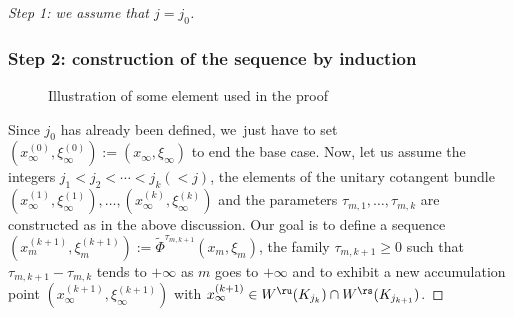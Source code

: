 \begin{proof}[Step 1: we assume that $j = j_0$]
\subsubsection*{Step 2: construction of the sequence by induction}
\begin{figure}[t]
\centering
\def\svgscale{0.6}

\caption{Illustration of some element used in the proof}
\end{figure}
Since $j_0$ has already been defined, we~just have to set $(x_{\infty}^{(0)}, \xi_{\infty}^{(0)}):= (x_{\infty}, \xi_{\infty})$ to end the base case. Now, let us assume the integers $j_1 < j_2 < \cdots < j_k (<j)$, the elements of the unitary cotangent bundle $(x_{\infty}^{(1)}, \xi_{\infty}^{(1)}),\dots, (x_{\infty}^{(k)}, \xi_{\infty}^{(k)})$ and the parameters $\tau_{m,1},\dots, \tau_{m,k}$ are constructed as in the above discussion. Our goal is to define a sequence $(x_{m}^{(k+1)}, \xi_{m}^{(k+1)}):= \widetilde{\Phi}^{\tau_{m,k+1}} (x_m,\xi_m)$, the family $\tau_{m,k+1} \geq 0$ such that $\tau_{m,k+1} - \tau_{m,k}$ tends to $+\infty$ as $m$ goes to $+\infty$ and to exhibit a new accumulation point $(x_{\infty}^{(k+1)}, \xi_{\infty}^{(k+1)})$ with $x_{\infty}^{(k+1)} \in W^\ru(K_{j_k})\cap W^\rs(K_{j_{k+1}})$.


\end{proof}
